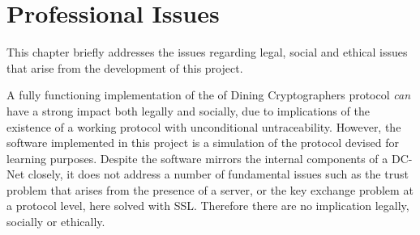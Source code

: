 \chapter{Professional Issues}
This chapter briefly addresses the issues regarding legal, social and ethical issues that arise from the development of this project. \newline

A fully functioning implementation of the of Dining Cryptographers protocol \textit{can} have a strong impact both legally and socially, due to implications of the existence of a working protocol with unconditional untraceability. However, the software implemented in this project is a simulation of the protocol devised for learning purposes. Despite the software mirrors the internal components of a DC-Net closely, it does not address a number of fundamental issues such as the trust problem that arises from the presence of a server, or the key exchange problem at a protocol level, here solved with SSL. Therefore there are no implication legally, socially or ethically.